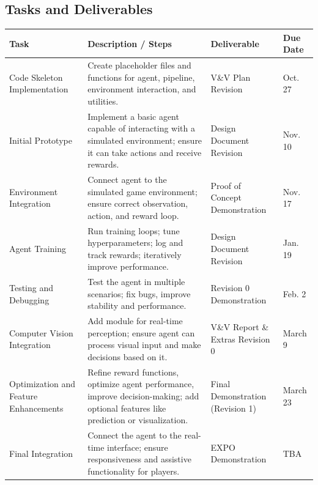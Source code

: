 \documentclass{article}
\begin{document}
\FloatBarrier

\subsection{Tasks and Deliverables}\label{subsec:tasks}
\begin{table}[htbp]
\centering
\begin{tabular}{|p{3cm}|p{5cm}|p{3cm}|p{2cm}|}
\hline
\textbf{Task} & \textbf{Description / Steps} & \textbf{Deliverable} & \textbf{Due Date} \\ \hline

Code Skeleton Implementation & Create placeholder files and functions for \RL{} agent, \CV{} pipeline, environment interaction, and utilities. & V\&V Plan Revision & Oct. 27 \\ \hline

Initial \RL{} Prototype & Implement a basic \RL{} agent capable of interacting with a simulated environment; ensure it can take actions and receive rewards. & Design Document Revision & Nov. 10 \\ \hline

Environment Integration & Connect \RL{} agent to the simulated game environment; ensure correct observation, action, and reward loop. & Proof of Concept Demonstration & Nov. 17 \\ \hline

Agent Training & Run \RL{} training loops; tune hyperparameters; log and track rewards; iteratively improve performance. & Design Document Revision & Jan. 19 \\ \hline

Testing and Debugging & Test the \RL{} agent in multiple scenarios; fix bugs, improve stability and performance. & Revision 0 Demonstration & Feb. 2 \\ \hline

Computer Vision Integration & Add \CV{} module for real-time perception; ensure agent can process visual input and make decisions based on it. & V\&V Report \& Extras Revision 0 & March 9 \\ \hline

Optimization and Feature Enhancements & Refine reward functions, optimize agent performance, improve decision-making; add optional features like prediction or visualization. & Final Demonstration (Revision 1) & March 23 \\ \hline

Final Integration & Connect the agent to the real-time interface; ensure responsiveness and assistive functionality for players. & EXPO Demonstration & TBA \\ \hline


\end{tabular}
\end{table}
\end{document}

